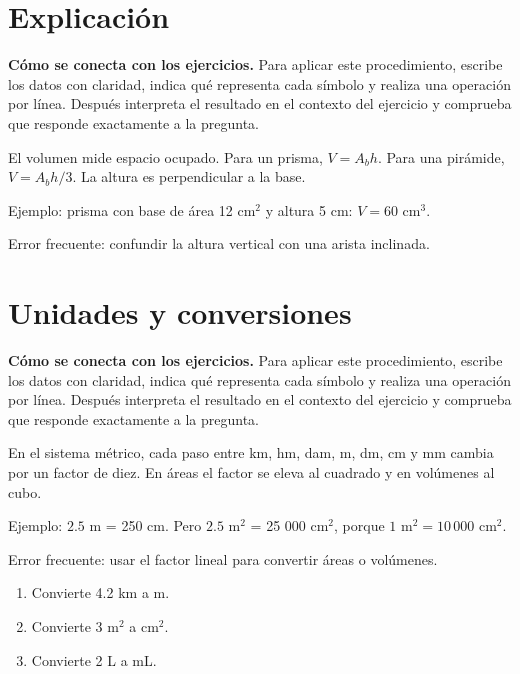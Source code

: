 \documentclass[10pt,oneside,openany]{book}
\begin{document}
\section{Explicación}

\textbf{Cómo se conecta con los ejercicios.} Para aplicar este procedimiento, escribe los datos con claridad, indica qué representa cada símbolo y realiza una operación por línea. Después interpreta el resultado en el contexto del ejercicio y comprueba que responde exactamente a la pregunta.

El volumen mide espacio ocupado. Para un prisma, $V=A_bh$. Para una pirámide, $V=A_bh/3$. La altura es perpendicular a la base.



\begin{ejemplo}
Ejemplo: prisma con base de área 12 cm$^2$ y altura 5 cm: $V=60$ cm$^3$.
\end{ejemplo}

\begin{ojo}
Error frecuente: confundir la altura vertical con una arista inclinada.
\end{ojo}



\section{Unidades y conversiones}

\textbf{Cómo se conecta con los ejercicios.} Para aplicar este procedimiento, escribe los datos con claridad, indica qué representa cada símbolo y realiza una operación por línea. Después interpreta el resultado en el contexto del ejercicio y comprueba que responde exactamente a la pregunta.

En el sistema métrico, cada paso entre km, hm, dam, m, dm, cm y mm cambia por un factor de diez. En áreas el factor se eleva al cuadrado y en volúmenes al cubo.

\begin{ejemplo}
Ejemplo: $2.5$ m = 250 cm. Pero $2.5$ m$^2$ = 25 000 cm$^2$, porque $1$ m$^2=10\,000$ cm$^2$.
\end{ejemplo}

\begin{ojo}
Error frecuente: usar el factor lineal para convertir áreas o volúmenes.
\end{ojo}

\begin{practica}

\begin{enumerate}

\item Convierte 4.2 km a m.

\item Convierte 3 m$^2$ a cm$^2$.

\item Convierte 2 L a mL.

\end{enumerate}

\end{practica}
\end{document}
